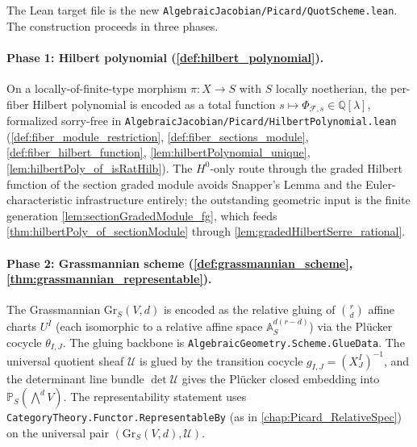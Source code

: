 The Lean target file is the new
\texttt{AlgebraicJacobian/Picard/QuotScheme.lean}. The construction
proceeds in three phases.

\paragraph{Phase 1: Hilbert polynomial (\cref{def:hilbert_polynomial}).}
On a locally-of-finite-type morphism \(\pi : X \to S\) with \(S\) locally
noetherian, the per-fiber Hilbert polynomial is encoded as a total function
\(s \mapsto \Phi_{\mathcal{F},s} \in \mathbb{Q}[\lambda]\), formalized
sorry-free in \texttt{AlgebraicJacobian/Picard/HilbertPolynomial.lean}
(\cref{def:fiber_module_restriction}, \cref{def:fiber_sections_module},
\cref{def:fiber_hilbert_function}, \cref{lem:hilbertPolynomial_unique},
\cref{lem:hilbertPoly_of_isRatHilb}). The \(H^0\)-only route through the
graded Hilbert function of the section graded module avoids Snapper's Lemma
and the Euler-characteristic infrastructure entirely; the outstanding
geometric input is the finite generation \cref{lem:sectionGradedModule_fg},
which feeds \cref{thm:hilbertPoly_of_sectionModule} through
\cref{lem:gradedHilbertSerre_rational}.

\paragraph{Phase 2: Grassmannian scheme (\cref{def:grassmannian_scheme},
\cref{thm:grassmannian_representable}).} The Grassmannian
\(\mathrm{Gr}_S(V, d)\) is encoded as the relative gluing of \(\binom{r}{d}\)
affine charts \(U^I\) (each isomorphic to a relative affine space
\(\mathbb{A}^{d(r-d)}_S\)) via the Pl\"ucker cocycle \(\theta_{I,J}\). The
gluing backbone is \texttt{AlgebraicGeometry.Scheme.GlueData}. The
universal quotient sheaf \(\mathcal{U}\) is glued by the transition cocycle
\(g_{I,J} = (X^I_J)^{-1}\), and the determinant line bundle
\(\det \mathcal{U}\) gives the Pl\"ucker closed embedding into
\(\mathbb{P}_S(\bigwedge^d V)\). The representability statement uses
\texttt{CategoryTheory.Functor.RepresentableBy} (as in
\cref{chap:Picard_RelativeSpec}) on the universal pair
\((\mathrm{Gr}_S(V, d), \mathcal{U})\).


